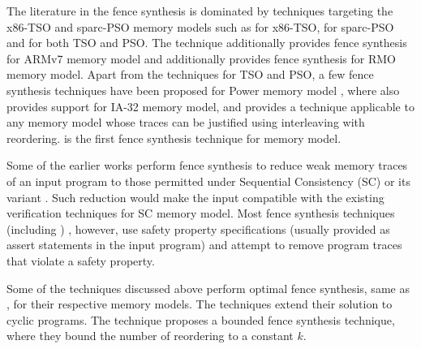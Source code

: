 The literature in the  fence synthesis is dominated by 
techniques targeting the x86-TSO and sparc-PSO memory models
such as \cite{abdulla2012counter,alglave2010fences,alglave2014don,linden2011verification,abdulla2012automatic,abdulla2015best,bender2015declarative} 
for x86-TSO,
\cite{abdulla2015precise,linden2013verification} 
for sparc-PSO and \cite{liu2012dynamic,meshman2014synthesis,abdulla2013memorax,joshi2015property,kuperstein2012automatic}
for both TSO and PSO.
%
The technique \cite{bender2015declarative} additionally
provides fence synthesis for ARMv7 memory model and 
\cite{kuperstein2012automatic} additionally provides
fence synthesis for RMO memory model.
%
Apart from the techniques for TSO and PSO, a few 
fence synthesis techniques have been proposed for Power
memory model 
\cite{alglave2010fences,abdulla2015precise,fang2003automatic}, 
where \cite{fang2003automatic} also 
provides support for IA-32 memory model, and
\cite{joshi2015property} provides a technique applicable to
any memory model whose traces can be justified using
interleaving with reordering.
%
\ourtechnique is the first fence synthesis technique for 
\cc memory model.

Some of the earlier works  
\cite{alglave2010fences,abdulla2015precise,fang2003automatic} 
perform fence synthesis to reduce weak memory traces of an 
input program to those permitted under Sequential Consistency (SC)
or its variant \cite{abdulla2015best}. Such reduction would
make the input compatible with the existing verification 
techniques  for SC memory model.
%
Most fence synthesis techniques (including \ourtechnique)
\cite{meshman2014synthesis}\cite{abdulla2012counter}\cite{abdulla2013memorax}\cite{joshi2015property}\cite{abdulla2015precise}\cite{linden2011verification}\cite{kuperstein2012automatic}\cite{abdulla2012automatic}\cite{linden2013verification}, however, 
use safety property specifications (usually provided as assert
statements in the input program) and attempt to remove 
program traces that violate a safety property.

Some of the techniques discussed above
\cite{meshman2014synthesis}\cite{taheri2019polynomial}\cite{abdulla2012counter}\cite{abdulla2013memorax}\cite{joshi2015property}\cite{abdulla2015precise}\cite{kuperstein2012automatic}\cite{bender2015declarative} perform optimal fence synthesis, 
same as \ourtechnique, for their respective memory models.
%
The techniques \cite{linden2011verification}\cite{linden2013verification} 
extend their solution to cyclic programs.
%
The technique \cite{joshi2015property} proposes a bounded 
fence synthesis technique, where they bound the number of 
reordering to a constant $k$.